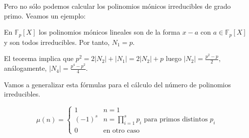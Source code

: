 Pero no sólo podemos calcular los polinomios mónicos irreducibles de grado primo. Veamos un ejemplo:

\begin{example}
	En $\mathbb{F}_p[X]$ los polinomios mónicos lineales son de la forma $x-a$ con $a \in \mathbb{F}_p[X]$ y son todos irreducibles. Por tanto, $N_1 = p$.
	
	El teorema implica que $p^2 = 2 |N_2| + |N_1| = 2 |N_2| + p$ luego $|N_2| = \frac{p^2 - p}{2}$, análogamente, $|N_4| = \frac{p^4 - p^2}{4}$.
\end{example}

Vamos a generalizar esta fórmulas para el cálculo del número de polinomios irreducibles. 

\begin{definition}
	\[
	\mu(n) = 
	\begin{cases} 
	1 & n = 1 \\
	(-1)^s & n = \prod_{i = 1}^s p_i  \text{ para primos distintos } p_i \\
	0   & \text{en otro caso}
	\end{cases}
	\]
\end{definition}


